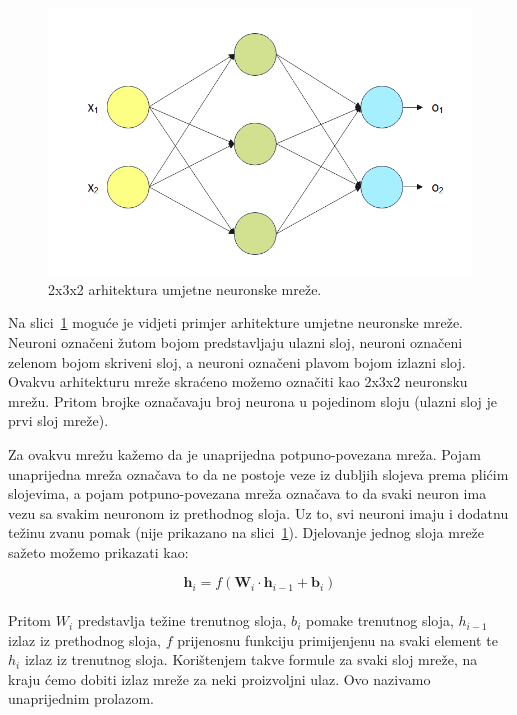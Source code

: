 \documentclass[times, utf8, zavrsni, numeric]{fer}
\begin{document}
\pagebreak
\begin{figure}[htb]
    \centering
    \includegraphics{basic_nn_labeled.png}
    \caption{2x3x2 arhitektura umjetne neuronske mreže.}
    \label{fig:basic_nn}
\end{figure}

Na slici~\ref{fig:basic_nn} moguće je vidjeti primjer arhitekture umjetne neuronske mreže. 
Neuroni označeni žutom bojom predstavljaju ulazni sloj, neuroni označeni zelenom bojom skriveni sloj, a neuroni označeni plavom bojom izlazni sloj. 
Ovakvu arhitekturu mreže skraćeno možemo označiti kao 2x3x2 neuronsku mrežu. Pritom brojke označavaju broj neurona u pojedinom sloju (ulazni sloj je prvi sloj mreže).

Za ovakvu mrežu kažemo da je unaprijedna potpuno-povezana mreža. 
Pojam unaprijedna mreža označava to da ne postoje veze iz dubljih slojeva prema plićim slojevima, a pojam potpuno-povezana mreža označava to da svaki neuron ima vezu sa svakim neuronom iz prethodnog sloja.
Uz to, svi neuroni imaju i dodatnu težinu zvanu pomak (nije prikazano na slici~\ref{fig:basic_nn}). Djelovanje jednog sloja mreže sažeto možemo prikazati kao:

\begin{equation}
    \pmb{h}_{i} = f(\pmb{W}_{i} \cdot \pmb{h}_{i-1} + \pmb{b}_{i})
    \label{eq:nn_layer}
\end{equation}
\\
Pritom $W_{i}$ predstavlja težine trenutnog sloja, $b_{i}$ pomake trenutnog sloja, $h_{i-1}$ izlaz iz prethodnog sloja, $f$ prijenosnu funkciju primijenjenu na svaki element te $h_{i}$ izlaz iz trenutnog sloja.
Korištenjem takve formule za svaki sloj mreže, na kraju ćemo dobiti izlaz mreže za neki proizvoljni ulaz. Ovo nazivamo unaprijednim prolazom.
\end{document}
